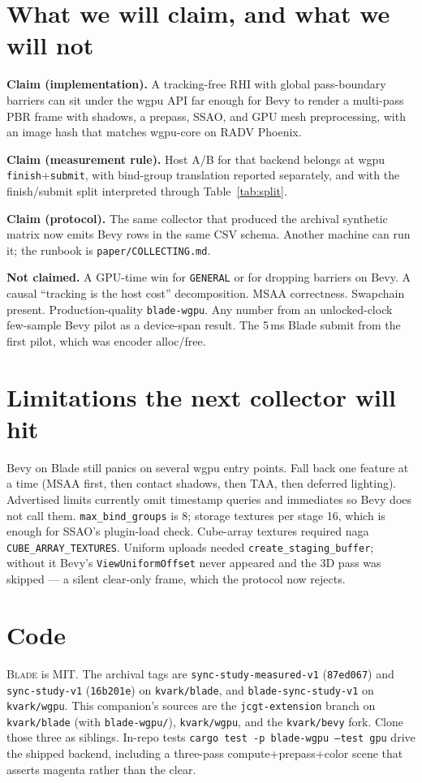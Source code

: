 \documentclass[10pt,twocolumn]{article}
\newcommand{\blade}{\textsc{Blade}}
\begin{document}
\section{What we will claim, and what we will not}

\textbf{Claim (implementation).}
A tracking-free RHI with global pass-boundary barriers can sit under the
wgpu API far enough for Bevy to render a multi-pass PBR frame with
shadows, a prepass, SSAO, and GPU mesh preprocessing, with an image hash
that matches wgpu-core on RADV Phoenix.

\textbf{Claim (measurement rule).}
Host A/B for that backend belongs at wgpu \texttt{finish}+\texttt{submit},
with bind-group translation reported separately, and with the finish/submit
split interpreted through Table~\ref{tab:split}.

\textbf{Claim (protocol).}
The same collector that produced the archival synthetic matrix now emits
Bevy rows in the same CSV schema. Another machine can run it; the
runbook is \texttt{paper/COLLECTING.md}.

\textbf{Not claimed.}
A GPU-time win for \texttt{GENERAL} or for dropping barriers on Bevy.
A causal ``tracking is the host cost'' decomposition. MSAA correctness.
Swapchain present. Production-quality \texttt{blade-wgpu}. Any number
from an unlocked-clock few-sample Bevy pilot as a device-span result.
The 5\,ms Blade submit from the first pilot, which was encoder
alloc/free.

\section{Limitations the next collector will hit}

Bevy on Blade still panics on several wgpu entry points. Fall back one
feature at a time (MSAA first, then contact shadows, then TAA, then
deferred lighting). Advertised limits currently omit timestamp queries
and immediates so Bevy does not call them. \texttt{max\_bind\_groups}
is 8; storage textures per stage 16, which is enough for SSAO's
plugin-load check. Cube-array textures required naga
\texttt{CUBE\_ARRAY\_TEXTURES}. Uniform uploads needed
\texttt{create\_staging\_buffer}; without it Bevy's
\texttt{ViewUniformOffset} never appeared and the 3D pass was skipped ---
a silent clear-only frame, which the protocol now rejects.

\section{Code}

\blade{} is MIT. The archival tags are \texttt{sync-study-measured-v1}
(\texttt{87ed067}) and \texttt{sync-study-v1} (\texttt{16b201e}) on
\texttt{kvark/blade}, and \texttt{blade-sync-study-v1} on
\texttt{kvark/wgpu}. This companion's sources are the \texttt{jcgt-extension} branch on
\texttt{kvark/blade} (with \texttt{blade-wgpu/}), \texttt{kvark/wgpu}, and
the \texttt{kvark/bevy} fork. Clone those three as siblings. In-repo tests
\texttt{cargo test -p blade-wgpu --test gpu} drive the shipped backend,
including a three-pass compute+prepass+color scene that asserts magenta
rather than the clear.



\end{document}
